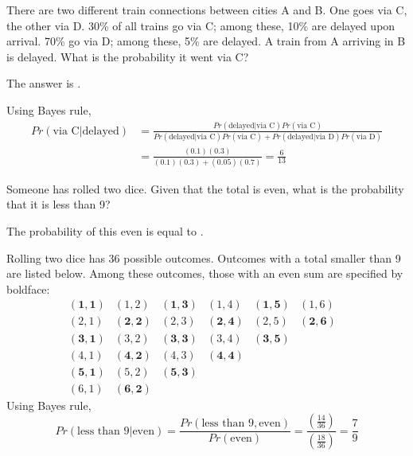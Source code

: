 \documentclass{ximera}
\begin{document}
\begin{question}
There are two different train connections between cities A and B.  One goes via C, the other via D.  30\% of all trains go via C; among these, 10\% are delayed upon arrival.  70\% go via D; among these, 5\% are delayed.   A train from A arriving in B is delayed.  What is the probability it went via C?
\begin{solution}
The answer is .
\end{solution}
Using Bayes rule,
\begin{align*}
Pr (\text{via C} | \text{delayed}) &= \frac{Pr(\text{delayed} | \text{via C}) Pr(\text{via C})}{Pr(\text{delayed} | \text{via C}) Pr(\text{via C}) + Pr(\text{delayed} | \text{via D}) Pr(\text{via D})} \\
& = \frac{(0.1)(0.3)}{(0.1)(0.3) + (0.05)(0.7)} = \frac{6}{13}
\end{align*}
\end{question}

\begin{question}
Someone has rolled two dice.  Given that the total is even, what is the probability that it is less than 9?
\begin{solution}
The probability of this even is equal to .
\end{solution}
Rolling two dice has 36 possible outcomes. Outcomes with a total smaller than 9 are listed below. Among these outcomes, those with an even sum are specified by boldface:
\begin{equation*}
\begin{matrix}
\mathbf{(1,1)} & (1,2) & \mathbf{(1,3)} & (1,4) & \mathbf{(1,5)} & (1,6) \\
(2,1) & \mathbf{(2,2)} & (2,3) & \mathbf{(2,4)} & (2,5) & \mathbf{(2,6)} \\
\mathbf{(3,1)} & (3,2) & \mathbf{(3,3)} & (3,4) & \mathbf{(3,5)} && \\
(4,1) & \mathbf{(4,2)} & (4,3) & \mathbf{(4,4)} &&& \\
\mathbf{(5,1)} & (5,2) & \mathbf{(5,3)} &&&& \\
(6,1) & \mathbf{(6,2)}
\end{matrix}
\end{equation*}
Using Bayes rule,
\begin{equation*}
Pr (\text{less than 9} | \text{even}) = \frac{Pr(\text{less than 9}, \text{even})}{Pr(\text{even})} = \frac{(\frac{14}{36})}{(\frac{18}{36})} = \frac{7}{9}
\end{equation*}
\end{question}
\end{document}
